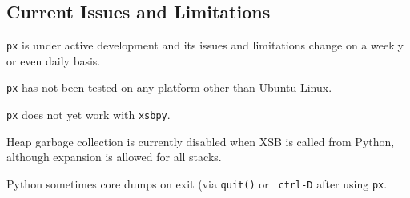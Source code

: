 \subsection{Current Issues and Limitations}

{\tt px} is under active development and its issues and limitations
change on a weekly or even daily basis.

\bi

\item {\tt px} has not been tested on any platform other than Ubuntu
  Linux.
\item {\tt px} does not yet work with {\tt xsbpy}.
\item Heap garbage collection is currently disabled when XSB is called
  from Python, although expansion is allowed for all stacks. 
\item Python sometimes core dumps on exit (via {\tt quit()} or {\tt
  ctrl-D} after using {\tt px}.
  
\ei  
